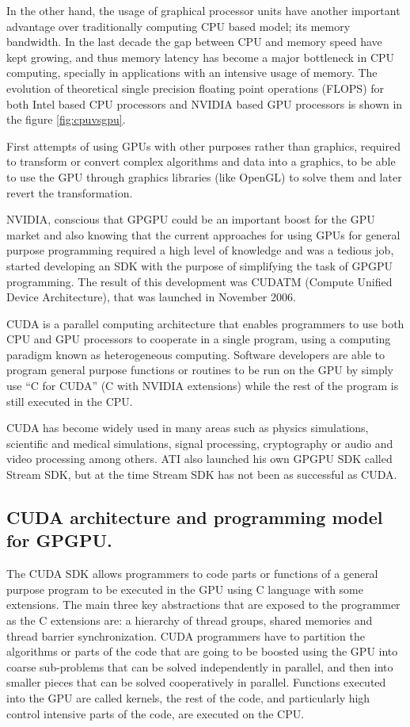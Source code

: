 \documentclass[thesis=M,english]{FITthesis}[2011/07/15]
\begin{document}
In the other hand, the usage of graphical processor units have another important advantage over traditionally computing CPU based model; its memory bandwidth. In the last decade the gap between CPU and memory speed have kept growing, and thus memory latency has become a major bottleneck in CPU computing, specially in applications with an intensive usage of memory. The evolution of theoretical single precision floating point operations (FLOPS) for both Intel based CPU processors and NVIDIA based GPU processors is shown in the figure \ref{fig:cpuvsgpu}. 

First attempts of using GPUs with other purposes rather than graphics, required to transform or convert complex algorithms and data into a graphics, to be able to use the GPU through graphics libraries (like OpenGL) to solve them and later revert the transformation. 

NVIDIA, conscious that GPGPU could be an important boost for the GPU market and also knowing that the current approaches for using GPUs for general purpose programming required a high level of knowledge and was a tedious job, started developing an SDK with the purpose of simplifying the task of GPGPU programming. The result of this development was CUDATM (Compute Unified Device Architecture), that was launched in November 2006. 

CUDA is a parallel computing architecture that enables programmers to use both CPU and GPU processors to cooperate in a single program, using a computing paradigm known as heterogeneous computing. Software developers are able to program general purpose functions or routines to be run on the GPU by simply use “C for CUDA” (C with NVIDIA extensions) while the rest of the program is still executed in the CPU. 

CUDA has become widely used in many areas such as physics simulations, scientific and medical simulations, signal processing, cryptography or audio and video processing among others. ATI also launched his own GPGPU SDK called Stream SDK, but at the time Stream SDK has not been as successful as CUDA.

\subsection{CUDA architecture and programming model for GPGPU.}

The CUDA SDK allows programmers to code parts or functions of a general purpose program to be executed in the GPU using C language with some extensions. The main three key abstractions that are exposed to the programmer as the C extensions are: a hierarchy of thread groups, shared memories and thread barrier synchronization. CUDA programmers have to partition the algorithms or parts of the code that are going to be boosted using the GPU into coarse sub-problems that can be solved independently in parallel, and then into smaller pieces that can be solved cooperatively in parallel. Functions executed into the GPU are called kernels, the rest of the code, and particularly
high control intensive parts of the code, are executed on the CPU. 
\end{document}

